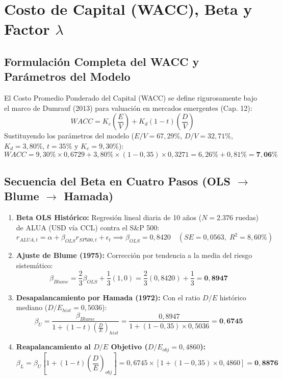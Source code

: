 \documentclass[10pt,a4paper]{article}
\begin{document}
\section{Costo de Capital (WACC), Beta y Factor \texorpdfstring{$\lambda$}{lambda}}

\subsection{Formulación Completa del WACC y Parámetros del Modelo}
El Costo Promedio Ponderado del Capital (WACC) se define rigurosamente bajo el marco de Dumrauf (2013) para valuación en mercados emergentes (Cap. 12):
\begin{equation}
    WACC = K_e \left(\frac{E}{V}\right) + K_d (1 - t) \left(\frac{D}{V}\right)
\end{equation}
Sustituyendo los parámetros del modelo ($E/V = 67,29\%$, $D/V = 32,71\%$, $K_d = 3,80\%$, $t = 35\%$ y $K_e = 9,30\%$):
\begin{equation}
    WACC = 9,30\% \times 0,6729 + 3,80\% \times (1 - 0,35) \times 0,3271 = 6,26\% + 0,81\% = \mathbf{7,06\%}
\end{equation}

\subsection{Secuencia del Beta en Cuatro Pasos (OLS \texorpdfstring{$\to$}{->} Blume \texorpdfstring{$\to$}{->} Hamada)}
\begin{enumerate}
    \item \textbf{Beta OLS Histórico:} Regresión lineal diaria de 10 años ($N=2.376$ ruedas) de ALUA (USD vía CCL) contra el S\&P 500:
    \begin{equation}
        r_{ALUA, t} = \alpha + \beta_{OLS} r_{SP500, t} + \epsilon_t \implies \beta_{OLS} = 0,8420 \quad (SE = 0,0563, \; R^2 = 8,60\%)
    \end{equation}
    \item \textbf{Ajuste de Blume (1975):} Corrección por tendencia a la media del riesgo sistemático:
    \begin{equation}
        \beta_{Blume} = \frac{2}{3} \beta_{OLS} + \frac{1}{3} (1,0) = \frac{2}{3} (0,8420) + \frac{1}{3} = \mathbf{0,8947}
    \end{equation}
    \item \textbf{Desapalancamiento por Hamada (1972):} Con el ratio $D/E$ histórico mediano ($D/E_{hist} = 0,5036$):
    \begin{equation}
        \beta_U = \frac{\beta_{Blume}}{1 + (1 - t) \left(\frac{D}{E}\right)_{hist}} = \frac{0,8947}{1 + (1 - 0,35) \times 0,5036} = \mathbf{0,6745}
    \end{equation}
    \item \textbf{Reapalancamiento al $D/E$ Objetivo ($D/E_{obj} = 0,4860$):}
    \begin{equation}
        \beta_L = \beta_U \left[ 1 + (1 - t) \left(\frac{D}{E}\right)_{obj} \right] = 0,6745 \times [1 + (1 - 0,35) \times 0,4860] = \mathbf{0,8876}
    \end{equation}
\end{enumerate}
\end{document}
